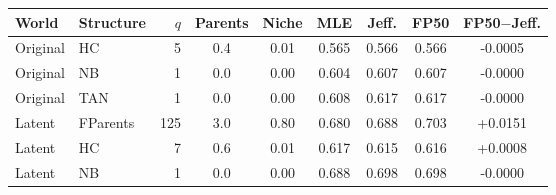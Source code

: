 \begin{tabular}{llrcccccc}\toprule
World & Structure & $q$ & Parents & Niche & MLE & Jeff. & FP50 & FP50$-$Jeff.\\\midrule
Original & HC & 5 & 0.4 & 0.01 & 0.565 & 0.566 & 0.566 & -0.0005\\
Original & NB & 1 & 0.0 & 0.00 & 0.604 & 0.607 & 0.607 & -0.0000\\
Original & TAN & 1 & 0.0 & 0.00 & 0.608 & 0.617 & 0.617 & -0.0000\\
Latent & FParents & 125 & 3.0 & 0.80 & 0.680 & 0.688 & 0.703 & +0.0151\\
Latent & HC & 7 & 0.6 & 0.01 & 0.617 & 0.615 & 0.616 & +0.0008\\
Latent & NB & 1 & 0.0 & 0.00 & 0.688 & 0.698 & 0.698 & -0.0000\\
\bottomrule\end{tabular}